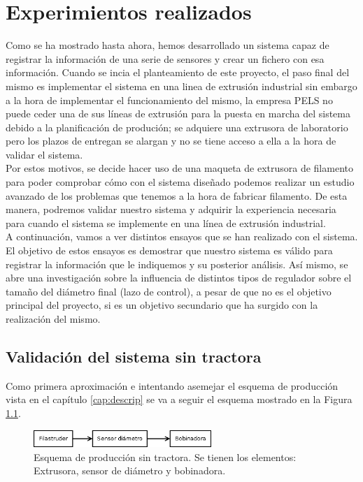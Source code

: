 \chapter{Experimientos realizados}
\label{cap:resultados}

Como se ha mostrado hasta ahora, hemos desarrollado un sistema capaz de registrar la información de una serie de sensores y crear un fichero con esa información. Cuando se incia el planteamiento de este proyecto, el paso final del mismo es implementar el sistema en una linea de extrusión industrial sin embargo a la hora de implementar el funcionamiento del mismo, la empresa PELS no puede ceder una de sus líneas de extrusión para la puesta en marcha del sistema debido a la planificación de produción; se adquiere una extrusora de laboratorio pero los plazos de entregan se alargan y no se tiene acceso a ella a la hora de validar el sistema.\\

Por estos motivos, se decide hacer uso de una maqueta de extrusora de filamento para poder comprobar cómo con el sistema diseñado podemos realizar un estudio avanzado de los problemas que tenemos a la hora de fabricar filamento. De esta manera, podremos validar nuestro sistema y adquirir la experiencia necesaria para cuando el sistema se implemente en una línea de extrusión industrial. \\

A continuación, vamos a ver distintos ensayos que se han realizado con el sistema. El objetivo de estos ensayos es demostrar que nuestro sistema es válido para registrar la información que le indiquemos y su posterior análisis. Así mismo, se abre una investigación sobre la influencia de distintos tipos de regulador sobre el tamaño del diámetro final (lazo de control), a pesar de que no es el objetivo principal del proyecto, si es un objetivo secundario que ha surgido con la realización del mismo.\\

\section{Validación del sistema sin tractora}
\label{sec:FSB}

Como primera aproximación e intentando asemejar el esquema de producción vista en el capítulo \ref{cap:descrip} se va a seguir el esquema mostrado en la Figura \ref{fig:esquemap_FSB}.

\begin{figure}[H]
    \centering
    \includegraphics[width=0.6\textwidth]{images/producciones/Diagram1.png}
    \caption[Esquema de producción sin tractora.]{Esquema de producción sin tractora. Se tienen los elementos: Extrusora, sensor de diámetro y bobinadora.}
    \label{fig:esquemap_FSB}
\end{figure}

